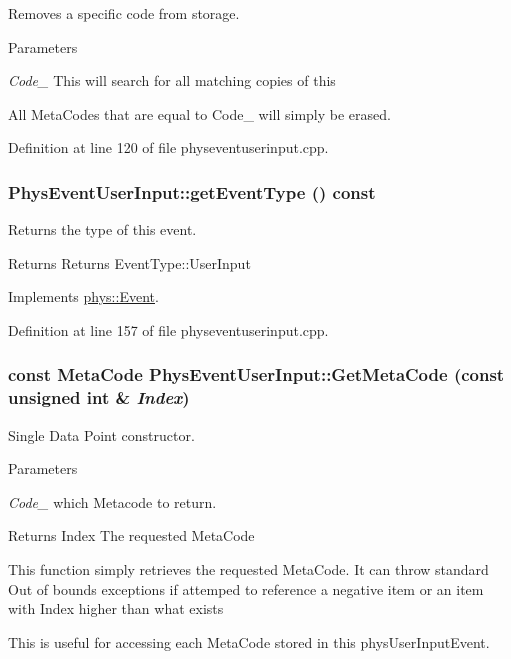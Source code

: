 Removes a specific code from storage. 


\begin{DoxyParams}{Parameters}
\item[{\em Code\_\-}]This will search for all matching copies of this\end{DoxyParams}
All MetaCodes that are equal to Code\_\- will simply be erased. 

Definition at line 120 of file physeventuserinput.cpp.

\hypertarget{classPhysEventUserInput_a2a39643cd222f7af0db7b087e0441582}{
\subsubsection[{getEventType}]{ PhysEventUserInput::getEventType () const}}
\label{dc/d0e/classPhysEventUserInput_a2a39643cd222f7af0db7b087e0441582}


Returns the type of this event. 

\begin{DoxyReturn}{Returns}
Returns EventType::UserInput 
\end{DoxyReturn}


Implements \hyperlink{classphys_1_1Event_ac2c0623a6bc399e62f4b9fb2c022ea73}{phys::Event}.



Definition at line 157 of file physeventuserinput.cpp.

\hypertarget{classPhysEventUserInput_aa564530c27f6983bb412e46c2c7ed086}{
\subsubsection[{GetMetaCode}]{\setlength{\rightskip}{0pt plus 5cm}const {\bf MetaCode} PhysEventUserInput::GetMetaCode (const unsigned int \& {\em Index})}}
\label{dc/d0e/classPhysEventUserInput_aa564530c27f6983bb412e46c2c7ed086}


Single Data Point constructor. 


\begin{DoxyParams}{Parameters}
\item[{\em Code\_\-}]which Metacode to return. \end{DoxyParams}
\begin{DoxyReturn}{Returns}
Index The requested MetaCode
\end{DoxyReturn}
This function simply retrieves the requested MetaCode. It can throw standard Out of bounds exceptions if attemped to reference a negative item or an item with Index higher than what exists \par
 This is useful for accessing each MetaCode stored in this physUserInputEvent. 

